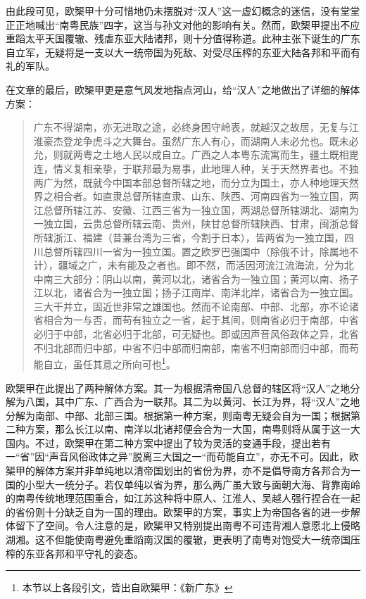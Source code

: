 由此段可见，欧榘甲十分可惜地仍未摆脱对“汉人”这一虚幻概念的迷信，没有堂堂正正地喊出“南粤民族”四字，这当与孙文对他的影响有关。然而，欧榘甲提出不应重蹈太平天国覆辙、残虐东亚大陆诸邦，则十分值得称道。此种主张下诞生的广东自立军，无疑将是一支以大一统帝国为死敌、对受尽压榨的东亚大陆各邦和平而有礼的军队。

在文章的最后，欧榘甲更是意气风发地指点河山，给“汉人”之地做出了详细的解体方案：

\begin{quote}
广东不得湖南，亦无进取之途，必终身困守岭表，就越汉之故居，无复与江淮豪杰登龙争虎斗之大舞台。虽然广东人有心，而湖南人未必允也。既未必允，则就两粤之土地人民以成自立。广西之人本粤东流寓而生，疆土既相毘连，情义复相亲挚，于联邦最为易事，此地理人种，关于天然界者也。不独两广为然，既就今中国本部总督所辖之地，而分立为国土，亦人种地理天然界之相合者。如直隶总督所辖直隶、山东、陕西、河南四省为一独立国，两江总督所辖江苏、安徽、江西三省为一独立国，两湖总督所辖湖北、湖南为一独立国，云贵总督所辖云南、贵州，陕甘总督所辖陕西、甘肃，闽浙总督所辖浙江、福建（昔兼台湾为三省，今割于日本），皆两省为一独立国，四川总督所辖四川一省为一独立国。置之欧罗巴强国中（除俄不计，除属地不计），疆域之广，未有能及之者也。即不然，而活因河流江流海流，分为北中南三大部分：阴山以南，黄河以北，诸省合为一独立国；黄河以南、扬子江以北，诸省合为一独立国；扬子江南岸、南洋北岸，诸省合为一独立国。三大干并立，固近世非常之雄国也。然而不论南部、中部、北部，亦不论诸省相合为一与否，而苟有独立之一省，起于其间，则南省必归于南部，中省必归于中部，北省必归于北部，可无疑也。即或因声音风俗政体之异，北省不归北部而归中部，中省不归中部而归南部，南省不归南部而归中部，而苟能自立，虽任其意之所向可也\footnote{本节以上各段引文，皆出自欧榘甲：《新广东》}。

\end{quote}

欧榘甲在此提出了两种解体方案。其一为根据清帝国八总督的辖区将“汉人”之地分解为八国，其中广东、广西合为一联邦。其二为以黄河、长江为界，将“汉人”之地分解为南部、中部、北部三国。根据第一种方案，则南粤无疑会自为一国；根据第二种方案，那么长江以南、南洋以北诸邦便会合为一大国，南粤则将从属于这一大国内。不过，欧榘甲在第二种方案中提出了较为灵活的变通手段，提出若有一“省”因“声音风俗政体之异”脱离三大国之一“而苟能自立”，亦无不可。因此，欧榘甲的解体方案并非单纯地以清帝国划出的省份为界，亦不是倡导南方各邦合为一国的小型大一统分子。若仅单纯以省为界，那么两广虽大致与面朝大海、背靠南岭的南粤传统地理范围重合，如江苏这种将中原人、江淮人、吴越人强行捏合在一起的省份则十分缺乏自为一国的理由。欧榘甲的方案，事实上为帝国各省的进一步解体留下了空间。令人注意的是，欧榘甲又特别提出南粤不可违背湘人意愿北上侵略湖湘。这不但能使南粤避免重蹈南汉国的覆辙，更表明了南粤对饱受大一统帝国压榨的东亚各邦和平守礼的姿态。

